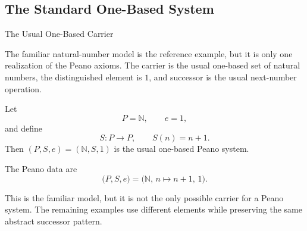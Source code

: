 \subsection*{The Standard One-Based System}

\begin{topicbox}{The Usual One-Based Carrier}
\begin{exposition}
The familiar natural-number model is the reference example, but it is only one
realization of the Peano axioms. The carrier is the usual one-based set of
natural numbers, the distinguished element is $1$, and successor is the usual
next-number operation.
\end{exposition}

\begin{example*}
Let
\[
P=\mathbb{N}, \qquad e=1,
\]
and define
\[
S:P\to P,
\qquad
S(n)=n+1.
\]
Then $(P,S,e)=(\mathbb{N},S,1)$ is the usual one-based Peano system.
\end{example*}

\begin{remark*}[Structure]
The Peano data are
\[
\bigl(P,S,e\bigr)
=
\bigl(\mathbb{N},\,n\mapsto n+1,\,1\bigr).
\]
\end{remark*}

\begin{remark*}[Interpretation]
This is the familiar model, but it is not the only possible carrier for a
Peano system. The remaining examples use different elements while preserving
the same abstract successor pattern.
\end{remark*}
\end{topicbox}


